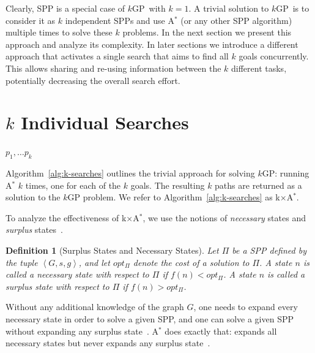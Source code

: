 \documentclass{aicom2e}
\newtheorem{definition}{Definition}
\newcommand{\kgs}{$k$GP}
\newcommand{\astar}{A$^*$}
\newcommand{\kxastar}{k$\times$A$^*$}
\newcommand{\tuple}[1]{\ensuremath{\left \langle #1 \right \rangle }}
\newcommand{\roni}[1]{\textbf{[RS:#1]}}
\begin{document}

Clearly, SPP is a special case of \kgs\ with $k=1$. A trivial solution to \kgs\
is to consider it as $k$ independent SPPs and use \astar{} (or any other SPP
algorithm) multiple times to solve these $k$ problems. In the next section we
present this approach and analyze its complexity. In later sections we
introduce a different approach that activates a single search that aims to find
all $k$ goals concurrently. This allows sharing and re-using information
between the $k$ different tasks, potentially decreasing the overall search
effort.


\section{$k$ Individual Searches}
\label{sec:k-one-goal}
\begin{algorithm2e}[t!]
    \small
    \For{$i$=1 to $k$}{
        $p_i\gets$ \astar{}($s$,$g_i$)\\
    }
    \Return $p_1,\ldots p_k$\\
    \caption{\kxastar{}: \kgs{} with $k$ \astar{}s}
    \label{alg:k-searches}
\end{algorithm2e}




Algorithm~\ref{alg:k-searches} outlines the trivial approach for solving
\kgs{}: running \astar{} $k$ times, one for each of the $k$ goals. The
resulting $k$ paths are returned as a solution to the \kgs{} problem. We refer
to Algorithm~\ref{alg:k-searches} as \kxastar{}.


To analyze the effectiveness of \kxastar{}, we use the notions of {\em necessary} states and {\em surplus} states~\cite{goldenberg2014enhanced}.

\begin{definition}[Surplus States and Necessary States]
    Let $\Pi$ be a SPP defined by the tuple $\tuple{G,s,g}$, and let $opt_\Pi$ denote the cost of a solution to $\Pi$.
    A state $n$ is called a {\em necessary} state with respect to $\Pi$ if $f(n)<opt_\Pi$.
    A state $n$ is called a {\em surplus} state with respect to $\Pi$ if $f(n)>opt_\Pi$.
\label{def:surplus}
\end{definition}
Without any additional knowledge of the graph $G$, one needs to expand every necessary state in order to solve a given SPP,
and one can solve a given SPP without expanding any surplus state~\cite{dechter1985generalizedBestFirst,goldenberg2014enhanced}. 
\astar{} does exactly that: expands all necessary states but never expands any surplus state~\cite{dechter1985generalizedBestFirst}.
\end{document}

